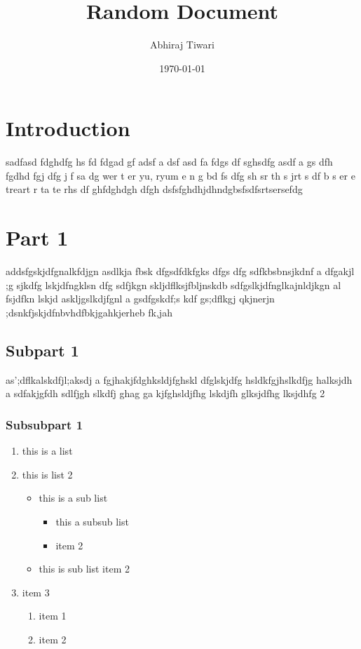 \documentclass[a4paper, 12pt]{article}
\begin{document}
	\title{Random Document}
	\author{Abhiraj Tiwari}
	\date{\today}
	\maketitle
	\newpage
	\tableofcontents
	\newpage
	\section{Introduction}
	sadfasd fdghdfg hs fd  fdgad gf adsf a dsf asd fa fdgs df sghsdfg
	asdf a gs dfh  fgdhd fgj  dfg j f sa dg wer t er yu, ryum e n g bd
	fs dfg sh sr th s jrt s  df b s er e treart r ta te rhs df ghfdghdgh dfgh
	dsfsfghdhjdhndgbsfsdfsrtsersefdg
	
	\section{Part 1}
	addsfgskjdfgnalkfdjgn asdlkja fbsk dfgsdfdkfgks dfgs dfg sdfkbsbnsjkdnf a dfgakjl ;g
	sjkdfg lskjdfngklsn dfg sdfjkgn skljdflksjfbljnskdb sdfgslkjdfnglkajnldjkgn al fsjdfkn lskjd 
	askljgslkdjfgnl  a gsdfgskdf;s kdf gs;dflkgj qkjnerjn ;dsnkfjskjdfnbvhdfbkjgahkjerheb fk,jah
	
	\subsection{Subpart 1}
	as';dflkalskdfjl;aksdj a fgjhakjfdghksldjfghskl dfglskjdfg hsldkfgjhslkdfjg halksjdh a
	sdfakjgfdh sdlfjgh slkdfj ghag
	ga kjfghsldjfhg lskdjfh glksjdfhg lksjdhfg
	2
	\subsubsection{Subsubpart 1}
	\begin{enumerate}
		\item this is a list
		\item this is list 2
			\begin{itemize}
				\item this is a sub list
					\begin{itemize}
						\item this a subsub list
						\item item 2
					\end{itemize}
				\item this is sub list item 2
			\end{itemize}
		\item item 3
			\begin{enumerate}
				\item item 1
				\item item 2
			\end{enumerate}
	\end{enumerate}
	
\end{document}
